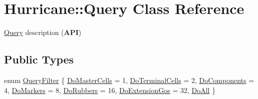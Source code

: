 \hypertarget{classHurricane_1_1Query}{}\section{Hurricane\+:\+:Query Class Reference}
\label{classHurricane_1_1Query}


\hyperlink{classHurricane_1_1Query}{Query} description ({\bfseries A\+PI})  


\subsection*{Public Types}
\begin{DoxyCompactItemize}
\item 
enum \hyperlink{classHurricane_1_1Query_a003517b82eaba58104d1749cf344eaa9}{Query\+Filter} \{ \newline
\hyperlink{classHurricane_1_1Query_a003517b82eaba58104d1749cf344eaa9a427b951cfef3fbeb3c2baa9abc4eae83}{Do\+Master\+Cells} = 1, 
\newline
\hyperlink{classHurricane_1_1Query_a003517b82eaba58104d1749cf344eaa9a2a1f9d4cf126b86694e05152a1b04ee9}{Do\+Terminal\+Cells} = 2, 
\newline
\hyperlink{classHurricane_1_1Query_a003517b82eaba58104d1749cf344eaa9a7b591d72b86f94f90d212746ed8f9f56}{Do\+Components} = 4, 
\newline
\hyperlink{classHurricane_1_1Query_a003517b82eaba58104d1749cf344eaa9ade01b12e4a2af3bfba0440caa557619a}{Do\+Markers} = 8, 
\newline
\hyperlink{classHurricane_1_1Query_a003517b82eaba58104d1749cf344eaa9a3671f7b32f05ccbd1db6e6e94da040e4}{Do\+Rubbers} = 16, 
\newline
\hyperlink{classHurricane_1_1Query_a003517b82eaba58104d1749cf344eaa9a241d98f4f53e908f113669540ef4288c}{Do\+Extension\+Gos} = 32, 
\newline
\hyperlink{classHurricane_1_1Query_a003517b82eaba58104d1749cf344eaa9ad3d1832e33bbdd8fa1e07ce622c984ec}{Do\+All}
 \}
\end{DoxyCompactItemize}
